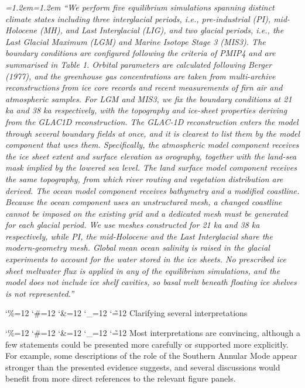 \documentclass[11pt,a4paper]{article}
\newcommand{\comment}[1]{\par\medskip\noindent\color{black}\begingroup\catcode`\%=12 \catcode`\#=12 \catcode`\&=12 \catcode`\_=12 \catcode`\~=12 \commentbody}
\newcommand{\commentbody}[1]{#1\endgroup\par\smallskip}
\newenvironment{change}{\par\smallskip\color{chgcol}\small\itshape\leftskip=1.2em\rightskip=1.2em\noindent\ignorespaces}{\par\smallskip}
\begin{document}
\begin{change}
``We perform five equilibrium simulations spanning distinct climate states including three interglacial periods, i.e., pre-industrial (PI), mid-Holocene (MH), and Last Interglacial (LIG), and two glacial periods, i.e., the Last Glacial Maximum (LGM) and Marine Isotope Stage 3 (MIS3). The boundary conditions are configured following the criteria of PMIP4 and are summarised in Table 1. Orbital parameters are calculated following Berger (1977), and the greenhouse gas concentrations are taken from multi-archive reconstructions from ice core records and recent measurements of firn air and atmospheric samples. For LGM and MIS3, we fix the boundary conditions at 21 ka and 38 ka respectively, with the topography and ice-sheet properties deriving from the GLAC1D reconstruction. The GLAC-1D reconstruction enters the model through several boundary fields at once, and it is clearest to list them by the model component that uses them. Specifically, the atmospheric model component receives the ice sheet extent and surface elevation as orography, together with the land-sea mask implied by the lowered sea level. The land surface model component receives the same topography, from which river routing and vegetation distribution are derived. The ocean model component receives bathymetry and a modified coastline. Because the ocean component uses an unstructured mesh, a changed coastline cannot be imposed on the existing grid and a dedicated mesh must be generated for each glacial period. We use meshes constructed for 21 ka and 38 ka respectively, while PI, the mid-Holocene and the Last Interglacial share the modern-geometry mesh. Global mean ocean salinity is raised in the glacial experiments to account for the water stored in the ice sheets. No prescribed ice sheet meltwater flux is applied in any of the equilibrium simulations, and the model does not include ice shelf cavities, so basal melt beneath floating ice shelves is not represented.''
\end{change}

\comment{R1}{Clarifying several interpretations}

\comment{R1}{Most interpretations are convincing, although a few statements could be presented more carefully or supported more explicitly. For example, some descriptions of the role of the Southern Annular Mode appear stronger than the presented evidence suggests, and several discussions would benefit from more direct references to the relevant figure panels.}
\end{document}
